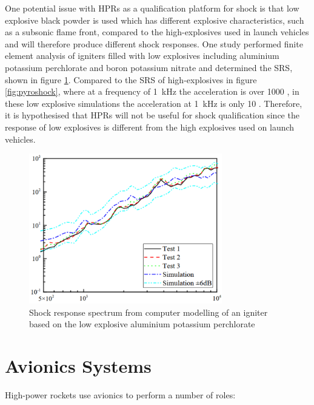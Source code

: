 \documentclass{report}
\begin{document}
One potential issue with HPRs as a qualification platform for shock is that low explosive black powder is used \cite{canepa2005modern} which has different explosive characteristics, such as a subsonic flame front, compared to the high-explosives used in launch vehicles \cite{bement1995manual} and will therefore produce different shock responses. One study \cite{wang2023numerical} performed finite element analysis of igniters filled with low explosives including aluminium potassium perchlorate and boron potassium nitrate and determined the SRS, shown in figure \ref{fig:lowsrs}. Compared to the SRS of high-explosives in figure \ref{fig:pyroshock}, where at a frequency of \SI{1}{\kilo\hertz} the acceleration is over \SI{1000}{\gacc} \cite{nasa-pyroshock}, in these low explosive simulations the acceleration at \SI{1}{\kilo\hertz} is only \SI{10}{\gacc} \cite{wang2023numerical}. Therefore, it is hypothesised that HPRs will not be useful for shock qualification since the response of low explosives is different from the high explosives used on launch vehicles.


\begin{figure}[H]
  \centering
  \includegraphics[width=0.75\textwidth]{images/deflagration.png}
  \caption{Shock response spectrum from computer modelling of an igniter based on the low explosive aluminium potassium perchlorate \cite{wang2023numerical}}
  \label{fig:lowsrs}
\end{figure}

\section{Avionics Systems}

High-power rockets use avionics to perform a number of roles:
\end{document}
